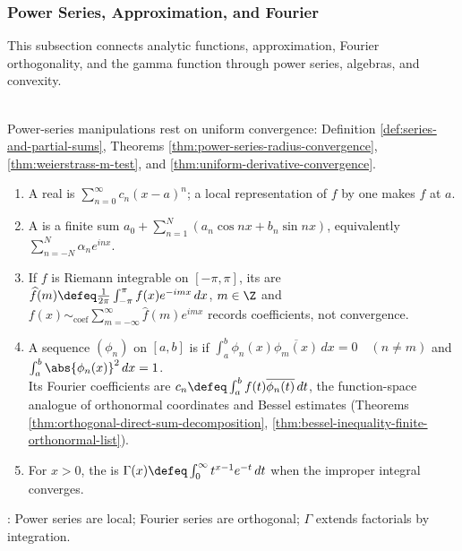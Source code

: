 \subsubsection{Power Series, Approximation, and Fourier}


This subsection connects analytic functions, approximation, Fourier orthogonality, and the gamma function through power series, algebras, and convexity.

\begin{motivation} \label{mot:power-series-as-controlled-infinite-polynomials} \\
Power-series manipulations rest on uniform convergence: Definition \ref{def:series-and-partial-sums}, Theorems \ref{thm:power-series-radius-convergence}, \ref{thm:weierstrass-m-test}, and \ref{thm:uniform-derivative-convergence}.
\end{motivation}

\begin{definition} \label{def:power-approx-fourier-core-source-todo}\label{def:power-approx-fourier-core-objects} 
\begin{enumerate}[label=(\roman*)]
\setlength{\itemsep}{0pt}
\item A real  is $\sum\limits_{n=0}^{\infty}c_n(x-a)^n$; a local representation of $f$ by one makes $f$  at $a$.
\item A  is a finite sum $a_0+\sum\limits_{n=1}^{N}(a_n\cos nx+b_n\sin nx)$, equivalently $\sum\limits_{n=-N}^{N}\alpha_ne^{inx}$.
\item If $f$ is Riemann integrable on $[-\pi,\pi]$, its  are $\widehat{f}(m)\defeq \frac{1}{2\pi}\int_{-\pi}^{\pi}f(x)e^{-imx}\,dx$, $m\in\Z$ and $f(x)\sim_{\mathrm{coef}}\sum\limits_{m=-\infty}^{\infty}\widehat{f}(m)e^{imx}$ records coefficients, not convergence.
\item A sequence $(\phi_n)$ on $[a,b]$ is  if $\int_a^b \phi_n(x)\overline{\phi_m(x)}\,dx=0\quad(n\neq m)$ and $\int_a^b\abs{\phi_n(x)}^2\,dx=1$.\\
Its Fourier coefficients are $c_n\defeq\int_a^b f(t)\overline{\phi_n(t)}\,dt$, the function-space analogue of orthonormal coordinates and Bessel estimates (Theorems \ref{thm:orthogonal-direct-sum-decomposition}, \ref{thm:bessel-inequality-finite-orthonormal-list}).
\item For $x>0$, the  is $\Gamma(x)\defeq\int_0^\infty t^{x-1}e^{-t}\,dt$ when the improper integral converges.
\end{enumerate}
: Power series are local; Fourier series are orthogonal; $\Gamma$ extends factorials by integration.
\end{definition}

